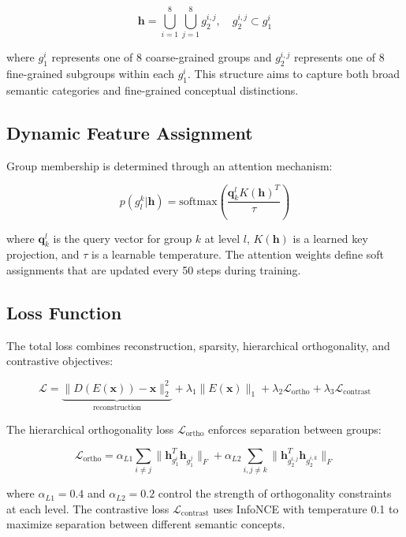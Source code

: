 \documentclass{article} %
\begin{document}
\begin{equation}
    \mathbf{h} = \bigcup_{i=1}^8 \bigcup_{j=1}^8 g_2^{i,j}, \quad g_2^{i,j} \subset g_1^i
\end{equation}

where $g_1^i$ represents one of 8 coarse-grained groups and $g_2^{i,j}$ represents one of 8 fine-grained subgroups within each $g_1^i$. This structure aims to capture both broad semantic categories and fine-grained conceptual distinctions.

\subsection{Dynamic Feature Assignment}
Group membership is determined through an attention mechanism:

\begin{equation}
    p(g_l^k|\mathbf{h}) = \text{softmax}\left(\frac{\mathbf{q}_k^l K(\mathbf{h})^T}{\tau}\right)
\end{equation}

where $\mathbf{q}_k^l$ is the query vector for group $k$ at level $l$, $K(\mathbf{h})$ is a learned key projection, and $\tau$ is a learnable temperature. The attention weights define soft assignments that are updated every 50 steps during training.

\subsection{Loss Function}
The total loss combines reconstruction, sparsity, hierarchical orthogonality, and contrastive objectives:

\begin{equation}
    \mathcal{L} = \underbrace{\|D(E(\mathbf{x})) - \mathbf{x}\|_2^2}_{\text{reconstruction}} + \lambda_1\|E(\mathbf{x})\|_1 + \lambda_2\mathcal{L}_{\text{ortho}} + \lambda_3\mathcal{L}_{\text{contrast}}
\end{equation}

The hierarchical orthogonality loss $\mathcal{L}_{\text{ortho}}$ enforces separation between groups:

\begin{equation}
    \mathcal{L}_{\text{ortho}} = \alpha_{L1}\sum_{i\neq j}\|\mathbf{h}_{g_1^i}^T\mathbf{h}_{g_1^j}\|_F + \alpha_{L2}\sum_{i,j\neq k}\|\mathbf{h}_{g_2^{i,j}}^T\mathbf{h}_{g_2^{i,k}}\|_F
\end{equation}

where $\alpha_{L1}=0.4$ and $\alpha_{L2}=0.2$ control the strength of orthogonality constraints at each level. The contrastive loss $\mathcal{L}_{\text{contrast}}$ uses InfoNCE with temperature 0.1 to maximize separation between different semantic concepts.
\end{document}
